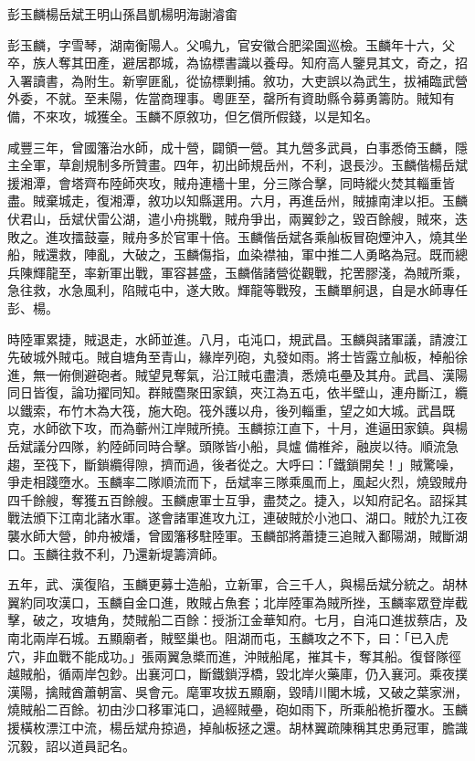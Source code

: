 
\begin{pinyinscope}
彭玉麟楊岳斌王明山孫昌凱楊明海謝濬畬

彭玉麟，字雪琴，湖南衡陽人。父鳴九，官安徽合肥梁園巡檢。玉麟年十六，父卒，族人奪其田產，避居郡城，為協標書識以養母。知府高人鑒見其文，奇之，招入署讀書，為附生。新寧匪亂，從協標剿捕。敘功，大吏誤以為武生，拔補臨武營外委，不就。至耒陽，佐當商理事。粵匪至，罄所有資助縣令募勇籌防。賊知有備，不來攻，城獲全。玉麟不原敘功，但乞償所假錢，以是知名。

咸豐三年，曾國籓治水師，成十營，闢領一營。其九營多武員，白事悉倚玉麟，隱主全軍，草創規制多所贊畫。四年，初出師規岳州，不利，退長沙。玉麟偕楊岳斌援湘潭，會塔齊布陸師夾攻，賊舟連檣十里，分三隊合擊，同時縱火焚其輜重皆盡。賊棄城走，復湘潭，敘功以知縣選用。六月，再進岳州，賊據南津以拒。玉麟伏君山，岳斌伏雷公湖，遣小舟挑戰，賊舟爭出，兩翼鈔之，毀百餘艘，賊來，迭敗之。進攻擂鼓臺，賊舟多於官軍十倍。玉麟偕岳斌各乘舢板冒砲煙沖入，燒其坐船，賊還救，陣亂，大破之，玉麟傷指，血染襟袖，軍中推二人勇略為冠。既而總兵陳輝龍至，率新軍出戰，軍容甚盛，玉麟偕諸營從觀戰，拕罟膠淺，為賊所乘，急往救，水急風利，陷賊屯中，遂大敗。輝龍等戰歿，玉麟單舸退，自是水師專任彭、楊。

時陸軍累捷，賊退走，水師並進。八月，屯沌口，規武昌。玉麟與諸軍議，請渡江先破城外賊屯。賊自塘角至青山，緣岸列砲，丸發如雨。將士皆露立舢板，棹船徐進，無一俯側避砲者。賊望見奪氣，沿江賊屯盡潰，悉燒屯壘及其舟。武昌、漢陽同日皆復，論功擢同知。群賊麕聚田家鎮，夾江為五屯，依半壁山，連舟斷江，纜以鐵索，布竹木為大筏，施大砲。筏外護以舟，後列輜重，望之如大城。武昌既克，水師欲下攻，而為蘄州江岸賊所撓。玉麟掠江直下，十月，進逼田家鎮。與楊岳斌議分四隊，約陸師同時合擊。頭隊皆小船，具爐備椎斧，融炭以待。順流急趨，至筏下，斷鎖纜得隙，擠而過，後者從之。大呼曰：「鐵鎖開矣！」賊驚噪，爭走相踐墮水。玉麟率二隊順流而下，岳斌率三隊乘風而上，風起火烈，燒毀賊舟四千餘艘，奪獲五百餘艘。玉麟慮軍士互爭，盡焚之。捷入，以知府記名。詔採其戰法頒下江南北諸水軍。遂會諸軍進攻九江，連破賊於小池口、湖口。賊於九江夜襲水師大營，帥舟被燔，曾國籓移駐陸軍。玉麟部將蕭捷三追賊入鄱陽湖，賊斷湖口。玉麟往救不利，乃還新堤籌濟師。

五年，武、漢復陷，玉麟更募士造船，立新軍，合三千人，與楊岳斌分統之。胡林翼約同攻漢口，玉麟自金口進，敗賊占魚套；北岸陸軍為賊所挫，玉麟率眾登岸截擊，破之，攻塘角，焚賊船二百餘：授浙江金華知府。七月，自沌口進拔蔡店，及南北兩岸石城。五顯廟者，賊堅巢也。阻湖而屯，玉麟攻之不下，曰：「已入虎穴，非血戰不能成功。」張兩翼急槳而進，沖賊船尾，摧其卡，奪其船。復督隊徑越賊船，循兩岸包鈔。出襄河口，斷鐵鎖浮橋，毀北岸火藥庫，仍入襄河。乘夜撲漢陽，擒賊酋蕭朝富、吳會元。麾軍攻拔五顯廟，毀晴川閣木城，又破之葉家洲，燒賊船二百餘。初由沙口移軍沌口，過經賊壘，砲如雨下，所乘船桅折覆水。玉麟援橫枚漂江中流，楊岳斌舟掠過，掉舢板拯之還。胡林翼疏陳稱其忠勇冠軍，膽識沉毅，詔以道員記名。


\end{pinyinscope}
